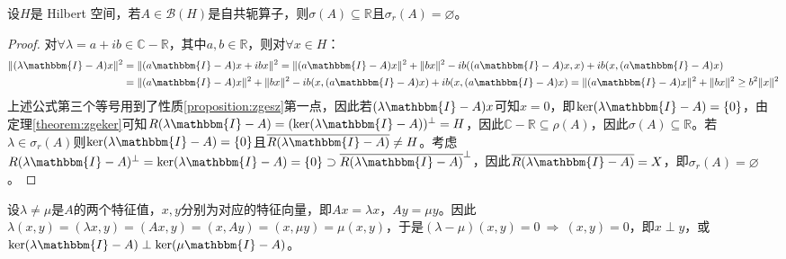 \begin{theorem}
设$H$是 Hilbert 空间，若$A\in\mathscr{B}(H)$是自共轭算子，则$\sigma(A) \subseteq \mathbb{R}$且$\sigma_r(A)=\varnothing$。
\end{theorem}
\begin{proof}
对$\forall \lambda=a+ib \in \mathbb{C}-\mathbb{R}$，其中$a,b \in \mathbb{R}$，则对$\forall x \in H$：
\[\begin{aligned}
\|(\lambda\mathbbm{I}-A)x\|^2&=\|(a\mathbbm{I}-A)x+ibx\|^2=\|(a\mathbbm{I}-A)x\|^2+\|bx\|^2-ib((a\mathbbm{I}-A)x,x)+ib(x,(a\mathbbm{I}-A)x)\\
&=\|(a\mathbbm{I}-A)x\|^2+\|bx\|^2-ib(x,(a\mathbbm{I}-A)x)+ib(x,(a\mathbbm{I}-A)x)=\|(a\mathbbm{I}-A)x\|^2+\|bx\|^2 \geq b^2\|x\|^2\\
\end{aligned}\]
上述公式第三个等号用到了性质\ref{proposition:zgesz}第一点，因此若$(\lambda\mathbbm{I}-A)x$可知$x=0$，即$\ker(\lambda\mathbbm{I}-A)=\{0\}$，由定理\ref{theorem:zgeker}可知$R(\lambda\mathbbm{I}-A)=(\ker(\lambda\mathbbm{I}-A))^{\perp}=H$，因此$\mathbb{C}-\mathbb{R} \subseteq \rho(A)$，因此$\sigma(A) \subseteq \mathbb{R}$。若$\lambda \in \sigma_r(A)$则$\ker(\lambda\mathbbm{I}-A)=\{0\}$且$\overline{R(\lambda\mathbbm{I}-A)} \neq H$。考虑$R(\lambda\mathbbm{I}-A)^{\perp}=\ker(\lambda\mathbbm{I}-A)=\{0\} \supset \overline{R(\lambda\mathbbm{I}-A)}^{\perp}$，因此$\overline{R(\lambda\mathbbm{I}-A)}=X$，即$\sigma_r(A)=\varnothing$。
\end{proof}
\begin{remark}
\quad 设$\lambda\neq\mu$是$A$的两个特征值，$x,y$分别为对应的特征向量，即$Ax=\lambda x$，$Ay=\mu y$。因此$\lambda(x,y) = (\lambda x,y) = (Ax,y) = (x,Ay) = (x,\mu y) = \mu(x,y)$，于是$(\lambda-\mu)(x,y)=0 \ \Rightarrow \ (x,y)=0$，即$x\perp y$，或$\ker(\lambda\mathbbm{I}-A) \perp \ker(\mu\mathbbm{I}-A)$。
\end{remark}

